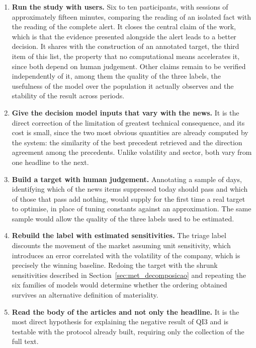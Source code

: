 \begin{enumerate}
  \item \textbf{Run the study with users.} Six to ten participants, with sessions of approximately
        fifteen minutes, comparing the reading of an isolated fact with the reading of the complete
        alert. It closes the central claim of the work, which is that the evidence presented
        alongside the alert leads to a better decision. It shares with the construction of an
        annotated target, the third item of this list, the property that no computational means
        accelerates it, since both depend on human judgement. Other claims remain to be verified
        independently of it, among them the quality of the three labels, the usefulness of the
        model over the population it actually observes and the stability of the result across
        periods.
  \item \textbf{Give the decision model inputs that vary with the news.} It is the direct
        correction of the limitation of greatest technical consequence, and its cost is small, since
        the two most obvious quantities are already computed by the system: the similarity of the
        best precedent retrieved and the direction agreement among the precedents. Unlike volatility
        and sector, both vary from one headline to the next.

  \item \textbf{Build a target with human judgement.} Annotating a sample of days, identifying
        which of the news items suppressed today should pass and which of those that pass add
        nothing, would supply for the first time a real target to optimise, in place of tuning
        constants against an approximation. The same sample would allow the quality of the three
        labels used to be estimated.

  \item \textbf{Rebuild the label with estimated sensitivities.} The triage label discounts the
        movement of the market assuming unit sensitivity, which introduces an error correlated with
        the volatility of the company, which is precisely the winning baseline. Redoing the target
        with the shrunk sensitivities described in Section~\ref{sec:met_decomposicao} and repeating
        the six families of models would determine whether the ordering obtained survives an
        alternative definition of materiality.

  \item \textbf{Read the body of the articles and not only the headline.} It is the most direct
        hypothesis for explaining the negative result of \gls{QI}3 and is testable with the protocol
        already built, requiring only the collection of the full text.


\end{enumerate}
